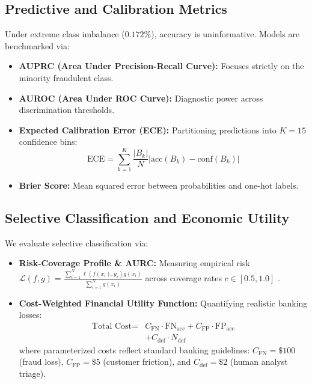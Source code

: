 \documentclass[10pt,a4paper,twocolumn]{article}
\begin{document}
\subsection{Predictive and Calibration Metrics}
Under extreme class imbalance ($0.172\%$), accuracy is uninformative. Models are benchmarked via:
\begin{itemize}
  \item \textbf{AUPRC (Area Under Precision-Recall Curve):} Focuses strictly on the minority fraudulent class.
  \item \textbf{AUROC (Area Under ROC Curve):} Diagnostic power across discrimination thresholds.
  \item \textbf{Expected Calibration Error (ECE):} Partitioning predictions into $K=15$ confidence bins:
  \begin{equation}
    \text{ECE} = \sum_{k=1}^K \frac{|B_k|}{N} \left| \text{acc}(B_k) - \text{conf}(B_k) \right|
  \end{equation}
  \item \textbf{Brier Score:} Mean squared error between probabilities and one-hot labels.
\end{itemize}

\subsection{Selective Classification and Economic Utility}
We evaluate selective classification via:
\begin{itemize}
  \item \textbf{Risk-Coverage Profile \& AURC:} Measuring empirical risk $\mathcal{L}(f, g) = \frac{\sum_{i=1}^N \ell(f(x_i), y_i) g(x_i)}{\sum_{i=1}^N g(x_i)}$ across coverage rates $c \in [0.5, 1.0]$ \cite{geifman2017selective}.
  \item \textbf{Cost-Weighted Financial Utility Function:} Quantifying realistic banking losses:
  \begin{equation}
    \begin{split}
      \text{Total Cost} = {} & C_{\text{FN}} \cdot \text{FN}_{\text{acc}} + C_{\text{FP}} \cdot \text{FP}_{\text{acc}} \\
      & + C_{\text{def}} \cdot N_{\text{def}}
    \end{split}
  \end{equation}
  where parameterized costs reflect standard banking guidelines: $C_{\text{FN}} = \$100$ (fraud loss), $C_{\text{FP}} = \$5$ (customer friction), and $C_{\text{def}} = \$2$ (human analyst triage).
\end{itemize}
\end{document}
